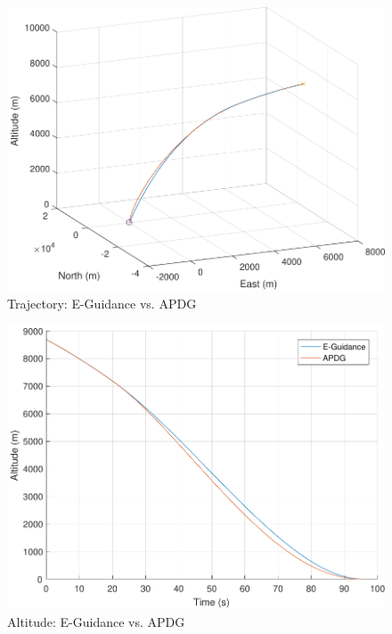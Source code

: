 \begin{figure}[H]
	\centering
	\begin{minipage}{4.3 in}
		\includegraphics[width=\linewidth]{Figures/trajEvsAPDG.pdf}
		\caption{Trajectory: E-Guidance vs. APDG \label{fig:trajEvsAPDG} }
	\end{minipage}
\end{figure}

\begin{figure}[H]
	\centering
	\begin{minipage}{4.3 in}
		\includegraphics[width=\linewidth]{Figures/altEvsAPDG.pdf}
		\caption{Altitude: E-Guidance vs. APDG \label{fig:altEvsAPDG} }
	\end{minipage}
\end{figure}

